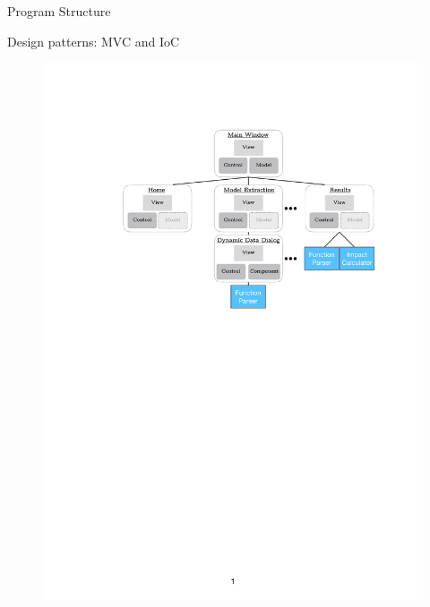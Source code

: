 \begin{frame}{Program Structure}

Design patterns: MVC and IoC

\begin{figure}
    \centering
    \includegraphics[page=1, width=0.9\linewidth]{.figures/Architecture.pdf}
\end{figure}

\end{frame}